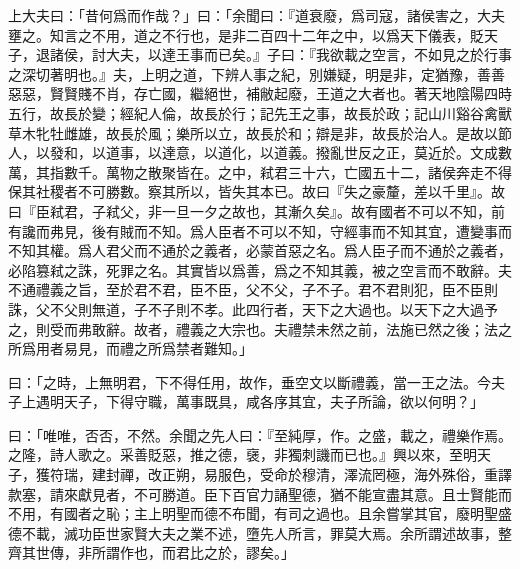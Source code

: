 上大夫曰：「昔何爲而作哉？」曰：「余聞曰：『道衰廢，爲司寇，諸侯害之，大夫壅之。知言之不用，道之不行也，是非二百四十二年之中，以爲天下儀表，貶天子，退諸侯，討大夫，以達王事而已矣。』子曰：『我欲載之空言，不如見之於行事之深切著明也。』夫，上明之道，下辨人事之紀，別嫌疑，明是非，定猶豫，善善惡惡，賢賢賤不肖，存亡國，繼絕世，補敝起廢，王道之大者也。著天地陰陽四時五行，故長於變；經紀人倫，故長於行；記先王之事，故長於政；記山川谿谷禽獸草木牝牡雌雄，故長於風；樂所以立，故長於和；辯是非，故長於治人。是故以節人，以發和，以道事，以達意，以道化，以道義。撥亂世反之正，莫近於。文成數萬，其指數千。萬物之散聚皆在。之中，弒君三十六，亡國五十二，諸侯奔走不得保其社稷者不可勝數。察其所以，皆失其本已。故曰『失之豪釐，差以千里』。故曰『臣弒君，子弒父，非一旦一夕之故也，其漸久矣』。故有國者不可以不知，前有讒而弗見，後有賊而不知。爲人臣者不可以不知，守經事而不知其宜，遭變事而不知其權。爲人君父而不通於之義者，必蒙首惡之名。爲人臣子而不通於之義者，必陷篡弒之誅，死罪之名。其實皆以爲善，爲之不知其義，被之空言而不敢辭。夫不通禮義之旨，至於君不君，臣不臣，父不父，子不子。君不君則犯，臣不臣則誅，父不父則無道，子不子則不孝。此四行者，天下之大過也。以天下之大過予之，則受而弗敢辭。故者，禮義之大宗也。夫禮禁未然之前，法施已然之後；法之所爲用者易見，而禮之所爲禁者難知。」

曰：「之時，上無明君，下不得任用，故作，垂空文以斷禮義，當一王之法。今夫子上遇明天子，下得守職，萬事既具，咸各序其宜，夫子所論，欲以何明？」

曰：「唯唯，否否，不然。余聞之先人曰：『至純厚，作。之盛，載之，禮樂作焉。之隆，詩人歌之。采善貶惡，推之德，襃，非獨刺譏而已也。』興以來，至明天子，獲符瑞，建封禪，改正朔，易服色，受命於穆清，澤流罔極，海外殊俗，重譯款塞，請來獻見者，不可勝道。臣下百官力誦聖德，猶不能宣盡其意。且士賢能而不用，有國者之恥；主上明聖而德不布聞，有司之過也。且余嘗掌其官，廢明聖盛德不載，滅功臣世家賢大夫之業不述，墮先人所言，罪莫大焉。余所謂述故事，整齊其世傳，非所謂作也，而君比之於，謬矣。」


